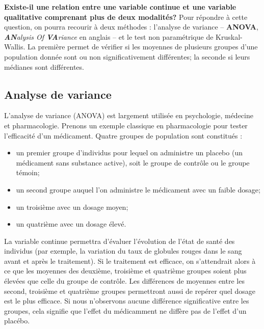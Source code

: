 \documentclass[
  11pt,
  french,
]{book}
\makeatletter
\providecommand{\tightlist}{%
  \setlength{\itemsep}{0pt}\setlength{\parskip}{0pt}}
\newenvironment{kframev}{%
\medskip{}
\setlength{\fboxsep}{.8em}
 \def\at@end@of@kframev{}%
 \ifinner\ifhmode%
  \def\at@end@of@kframev{\end{minipage}}%
  \begin{minipage}{\columnwidth}%
 \fi\fi%
 \def\FrameCommand##1{\hskip\@totalleftmargin \hskip-\fboxsep
 \colorbox{shadebluecolor}{##1}\hskip-\fboxsep
     \hskip-\linewidth \hskip-\@totalleftmargin \hskip\columnwidth}%
 \MakeFramed {\advance\hsize-\width
   \@totalleftmargin\z@ \linewidth\hsize
   \@setminipage}}%
 {\par\unskip\endMakeFramed%
 \at@end@of@kframev}
\newenvironment{rmdblock}[1]
  {
  \begin{itemize}
  \renewcommand{\labelitemi}{
    \raisebox{-.7\height}[0pt][0pt]{
      {\setkeys{Gin}{width=3em,keepaspectratio}\texttt{[image: images/\#1]}}
    }
  }
  \setlength{\fboxsep}{1em}
  \begin{kframev}
  \small
  \item
  }
  {
  \end{kframev}
  \end{itemize}
  }
\newenvironment{bloc_objectif}
  {\begin{rmdblock}{objectif}}
  {\end{rmdblock}}
\makeatother
\begin{document}
\begin{bloc_objectif}

\textbf{Existe-il une relation entre une variable continue et une variable qualitative comprenant plus de deux modalités?} Pour répondre à cette question, on pourra recourir à deux méthodes : l'analyse de variance -- \textbf{ANOVA}, \emph{\textbf{AN}alysis Of \textbf{VA}riance} en anglais -- et le test non paramétrique de Kruskal-Wallis. La première permet de vérifier si les moyennes de plusieurs groupes d'une population donnée sont ou non significativement différentes; la seconde si leurs médianes sont différentes.

\end{bloc_objectif}

\hypertarget{sect0441}{%
\subsection{Analyse de variance}\label{sect0441}}

L'analyse de variance (ANOVA) est largement utilisée en psychologie, médecine et pharmacologie. Prenons un exemple classique en pharmacologie pour tester l'efficacité d'un médicament. Quatre groupes de population sont constitués :

\begin{itemize}
\tightlist
\item
  un premier groupe d'individus pour lequel on administre un placebo (un médicament sans substance active), soit le groupe de contrôle ou le groupe témoin;
\item
  un second groupe auquel l'on administre le médicament avec un faible dosage;
\item
  un troisième avec un dosage moyen;
\item
  un quatrième avec un dosage élevé.
\end{itemize}

La variable continue permettra d'évaluer l'évolution de l'état de santé des individus (par exemple, la variation du taux de globules rouges dans le sang avant et après le traitement). Si le traitement est efficace, on s'attendrait alors à ce que les moyennes des deuxième, troisième et quatrième groupes soient plus élevées que celle du groupe de contrôle. Les différences de moyennes entre les second, troisième et quatrième groupes permettront aussi de repérer quel dosage est le plus efficace. Si nous n'observons aucune différence significative entre les groupes, cela signifie que l'effet du médicamment ne diffère pas de l'effet d'un placébo.
\end{document}
